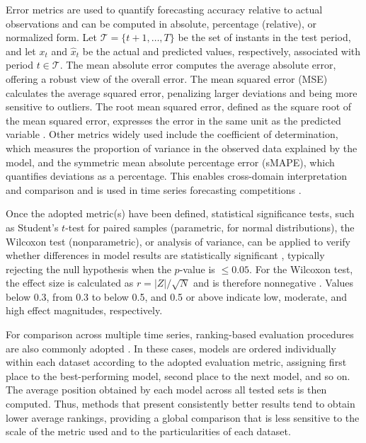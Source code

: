 \documentclass[final,3p,times,twocolumn,authoryear]{elsarticle}
\begin{document}
Error metrics are used to quantify forecasting accuracy relative to actual observations and can be computed in absolute, percentage (relative), or normalized form. Let $\mathcal{T} = \{t+1, \dots, T\}$ be the set of instants in the test period, and let $x_t$ and $\hat{x}_t$ be the actual and predicted values, respectively, associated with period $t \in \mathcal{T}$. The mean absolute error computes the average absolute error, offering a robust view of the overall error. The mean squared error (MSE) calculates the average squared error, penalizing larger deviations and being more sensitive to outliers. The root mean squared error, defined as the square root of the mean squared error, expresses the error in the same unit as the predicted variable \citep{hyndman_forecasting_2021}. Other metrics widely used include the coefficient of determination, which measures the proportion of variance in the observed data explained by the model, and the symmetric mean absolute percentage error (sMAPE), which quantifies deviations as a percentage. This enables cross-domain interpretation and comparison and is used in time series forecasting competitions \citep{koning_them3_2005, makridakis_m5_2022}.

Once the adopted metric(s) have been defined, statistical significance tests, such as Student's $t$-test for paired samples (parametric, for normal distributions), the Wilcoxon test (nonparametric), or analysis of variance, can be applied to verify whether differences in model results are statistically significant \citep{montgomery_applied_2011}, typically rejecting the null hypothesis when the $p$-value is $\leq 0.05$. For the Wilcoxon test, the effect size is calculated as $r=|Z|/\sqrt{N}$ and is therefore nonnegative \citep{tomczak_need_2014}. Values below 0.3, from 0.3 to below 0.5, and 0.5 or above indicate low, moderate, and high effect magnitudes, respectively.

For comparison across multiple time series, ranking-based evaluation procedures are also commonly adopted \citep{koning_them3_2005, makridakis_m5_2022}. In these cases, models are ordered individually within each dataset according to the adopted evaluation metric, assigning first place to the best-performing model, second place to the next model, and so on. The average position obtained by each model across all tested sets is then computed. Thus, methods that present consistently better results tend to obtain lower average rankings, providing a global comparison that is less sensitive to the scale of the metric used and to the particularities of each dataset.
\end{document}
